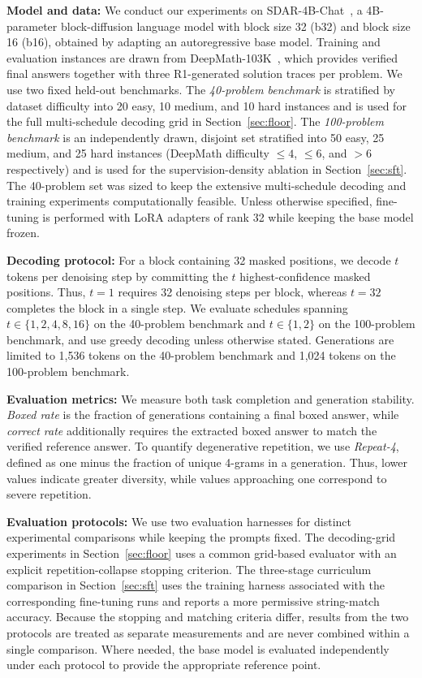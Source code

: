\documentclass{article}
\begin{document}
\textbf{Model and data:}
We conduct our experiments on SDAR-4B-Chat~\citep{cheng2025sdar}, a 4B-parameter block-diffusion language model with block size 32 (b32) and block size 16 (b16), obtained by adapting an autoregressive base model. Training and evaluation instances are drawn from DeepMath-103K~\citep{he2025deepmath}, which provides verified final answers together with three R1-generated solution traces per problem. We use two fixed held-out benchmarks. The \emph{40-problem benchmark} is stratified by dataset difficulty into 20 easy, 10 medium, and 10 hard instances and is used for the full multi-schedule decoding grid in Section~\ref{sec:floor}. The \emph{100-problem benchmark} is an independently drawn, disjoint set stratified into 50 easy, 25 medium, and 25 hard instances (DeepMath difficulty $\le 4$, $\le 6$, and $> 6$ respectively) and is used for the supervision-density ablation in Section~\ref{sec:sft}. The 40-problem set was sized to keep the extensive multi-schedule decoding and training experiments computationally feasible. Unless otherwise specified, fine-tuning is performed with LoRA adapters of rank 32 while keeping the base model frozen.

\textbf{Decoding protocol:} For a block containing 32 masked positions, we decode $t$ tokens per denoising step by committing the $t$ highest-confidence masked positions. Thus, $t = 1$ requires 32 denoising steps per block, whereas $t = 32$ completes the block in  a single step. We evaluate schedules spanning $t \in \{1, 2, 4, 8, 16\}$ on the 40-problem benchmark and $t \in \{1, 2\}$ on the 100-problem benchmark, and use greedy decoding unless otherwise stated. Generations are limited to 1,536 tokens on the 40-problem benchmark and 1,024 tokens on the 100-problem benchmark.

\textbf{Evaluation metrics:}
We measure both task completion and generation stability. \emph{Boxed rate} is the fraction of generations containing a final boxed answer, while \emph{correct rate} additionally requires the extracted boxed answer to match the verified reference answer. To quantify degenerative repetition, we use \emph{Repeat-4}, defined as one minus the fraction of unique 4-grams in a generation. Thus, lower values indicate greater diversity, while values approaching one correspond to severe repetition.

\textbf{Evaluation protocols:}
We use two evaluation harnesses for distinct experimental comparisons while keeping the prompts fixed. The decoding-grid experiments in Section~\ref{sec:floor} uses a common grid-based evaluator with an explicit repetition-collapse stopping criterion. The three-stage curriculum comparison in Section~\ref{sec:sft} uses the training harness associated with the corresponding fine-tuning runs and reports a more permissive string-match accuracy. Because the stopping and matching criteria differ, results from the two protocols are treated as separate measurements and are never combined within a single comparison. Where needed, the base model is evaluated independently under each protocol to provide the appropriate reference point.
\end{document}
